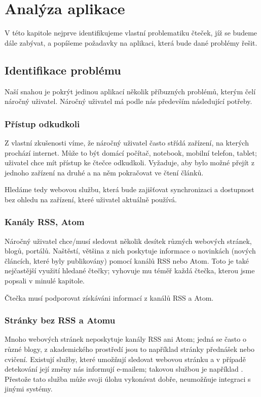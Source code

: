 \chapter{Analýza aplikace}

V této kapitole nejprve identifikujeme vlastní problematiku čteček, jíž se budeme dále zabývat, a popíšeme požadavky na aplikaci, která bude dané problémy řešit.

\section{Identifikace problému}

Naší snahou je pokrýt jedinou aplikací několik příbuzných problémů, kterým čelí náročný uživatel.
Náročný uživatel má podle nás především následující potřeby.

\subsection{Přístup odkudkoli}
Z vlastní zkušenosti víme, že náročný uživatel často střídá zařízení, na kterých prochází internet.
Může to být domácí počítač, notebook, mobilní telefon, tablet; uživatel chce mít přístup ke čtečce odkudkoli.
Vyžaduje, aby bylo možné přejít z jednoho zařízení na druhé a na něm pokračovat ve čtení článků.

Hledáme tedy webovou službu, která bude zajišťovat synchronizaci a dostupnost bez ohledu na zařízení, které uživatel aktuálně používá.

\subsection{Kanály RSS, Atom}
Náročný uživatel chce/musí sledovat několik desítek různých webových stránek, blogů, portálů.
Naštěstí, většina z nich poskytuje informace o novinkách (nových článcích, které byly publikovány) pomocí kanálů RSS nebo Atom.
Toto je také nejčastější využití hledané čtečky; vyhovuje mu téměř každá čtečka, kterou jsme popsali v minulé kapitole.

Čtečka musí podporovat získáváni informací z kanálů RSS a Atom.

\subsection{Stránky bez RSS a Atomu}
Mnoho webových stránek neposkytuje kanály RSS ani Atom; jedná se často o různé blogy, z akademického prostředí jsou to například stránky přednášek nebo cvičení.
Existují služby, které umožňují sledovat webovou stránku a v případě detekování její změny nás informují e-mailem; takovou službou je například .
Přestože tato služba může svoji úlohu vykonávat dobře, neumožňuje integraci s jinými systémy.

